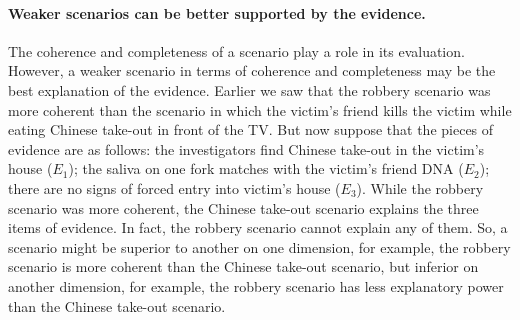 \documentclass[10pt]{article}
\begin{document}




\paragraph{Weaker scenarios can be better supported by the evidence.} 

The coherence and completeness of a scenario play a role in its evaluation. However, a weaker scenario in terms of coherence and completeness may be the best explanation of the evidence. Earlier we saw that the robbery scenario was more coherent than the scenario in which the victim's friend kills the victim while eating Chinese take-out in front of the TV. But now suppose that the pieces of evidence are as follows: the investigators find Chinese take-out in the victim's house ($E_1$); the saliva on one fork matches with the victim's friend DNA ($E_2$); there are no signs of forced entry into victim's house ($E_3$). While the robbery scenario was more coherent, the Chinese take-out scenario explains the three items of evidence. In fact, the robbery scenario cannot explain any of them. So, a scenario might be superior to another on one dimension, for example, the robbery scenario is more coherent than the Chinese take-out scenario, but inferior on another dimension, for example, the robbery scenario has less explanatory power than the Chinese take-out scenario. 






\end{document}
